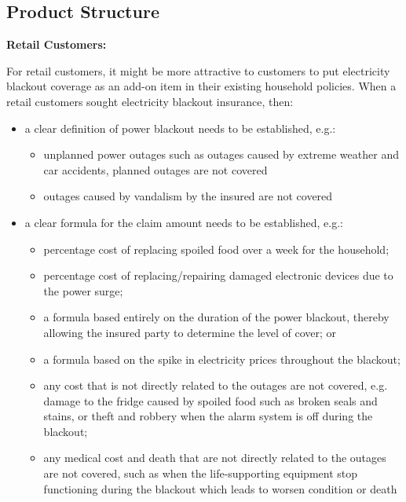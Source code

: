 \documentclass[12pt]{article}
\begin{document}
\subsection{Product Structure}
{\textbf{\large Retail Customers:}}\par
\begin{flushleft}
For retail customers, it might be more attractive to customers to put electricity blackout coverage as an add-on item in their existing household policies. When a retail customers sought electricity blackout insurance, then:
\begin{itemize}
    \item a clear definition of power blackout needs to be established, e.g.:
    \begin{itemize}
        \item unplanned power outages such as outages caused by extreme weather and car accidents, planned outages are not covered
        \item outages caused by vandalism by the insured are not covered
    \end{itemize}
    \item a clear formula for the claim amount needs to be established, e.g.:
    \begin{itemize}
        \item percentage cost of replacing spoiled food over a week for the household;
        \item percentage cost of replacing/repairing damaged electronic devices due to the power surge; 
        \item a formula based entirely on the duration of the power blackout, thereby allowing the insured party to determine the level of cover; or
        \item a formula based on the spike in electricity prices throughout the blackout;
        \item any cost that is not directly related to the outages are not covered, e.g. damage to the fridge caused by spoiled food such as broken seals and stains, or theft and robbery when the alarm system is off during the blackout;
        \item any medical cost and death that are not directly related to the outages are not covered, such as when the life-supporting equipment stop functioning during the blackout which leads to worsen condition or death 
    \end{itemize}
\end{itemize}
\end{flushleft}
\end{document}
